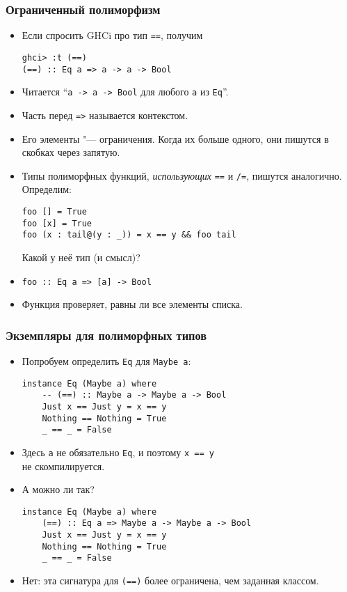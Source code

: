 \documentclass[10pt]{beamer}
\begin{document}
\begin{frame}[fragile]
  \frametitle{Ограниченный полиморфизм}
  \begin{itemize}
    \item Если спросить GHCi про тип \lstinline|==|, получим
          \begin{lstlisting}[basicstyle=\ttfamily\small]
ghci> :t (==)
(==) :: Eq a => a -> a -> Bool
\end{lstlisting}
    \item Читается \enquote{\lstinline|a -> a -> Bool| для любого \lstinline|a| из \lstinline|Eq|}.
    \item Часть перед \lstinline|=>| называется контекстом.
    \item Его элементы "--- ограничения. Когда их больше одного, они пишутся в скобках через запятую.\pause
    \item Типы полиморфных функций, \emph{использующих} \lstinline|==| и \lstinline|/=|, пишутся аналогично. Определим:
          \begin{lstlisting}[basicstyle=\ttfamily\small]
foo [] = True
foo [x] = True
foo (x : tail@(y : _)) = x == y && foo tail
\end{lstlisting}
          Какой у неё тип (и смысл)? \pause
    \item \lstinline[basicstyle=\ttfamily\small]|foo :: Eq a => [a] -> Bool| \pause
    \item Функция проверяет, равны ли все элементы списка.
  \end{itemize}
\end{frame}

\begin{frame}[fragile]
  \frametitle{Экземпляры для полиморфных типов}
  \begin{itemize}
    \item Попробуем определить \lstinline|Eq| для \lstinline|Maybe a|:\pause
          \begin{lstlisting}[basicstyle=\ttfamily\small]
instance Eq (Maybe a) where
    -- (==) :: Maybe a -> Maybe a -> Bool
    Just x == Just y = x == y
    Nothing == Nothing = True
    _ == _ = False
\end{lstlisting}
           \pause
    \item Здесь \lstinline|a| не обязательно \lstinline|Eq|, и поэтому \lstinline|x == y| \\не скомпилируется.
    \item А можно ли так?
          \begin{lstlisting}[basicstyle=\ttfamily\small]
instance Eq (Maybe a) where
    (==) :: Eq a => Maybe a -> Maybe a -> Bool
    Just x == Just y = x == y
    Nothing == Nothing = True
    _ == _ = False
\end{lstlisting} \pause
    \item Нет: эта сигнатура для \lstinline|(==)| более ограничена, чем заданная классом.
  \end{itemize}
\end{frame}
\end{document}
